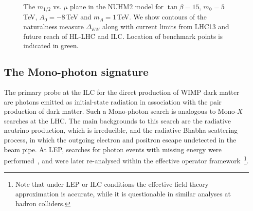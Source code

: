 \begin{figure}[]
  \begin{center}
  \end{center}
  \caption{\label{fig:searches_nuhm2_excl} The $m_{1/2}$ vs. $\mu$ plane in the 
NUHM2 model for $\tan\beta =15$, 
$m_0=5$\,TeV, $A_0=-8$\,TeV and $m_A=1$\,TeV. We show contours of the
naturalness measure $\Delta_{EW}$ \cite{Baer:2015rja}
along with current limits from LHC13 and future reach of HL-LHC and ILC.
Location of benchmark points is indicated in green.} 
\end{figure}


\subsection{The Mono-photon signature}
\label{subsec:searches_monophoton}

The primary probe at the ILC for the direct production of WIMP dark matter are photons
emitted as initial-state radiation in association with the pair production of dark matter.
Such a Mono-photon search is analogous  to Mono-$X$ searches at the LHC.
The main backgrounds to this search are the radiative neutrino production, which is irreducible,
and the radiative Bhabha scattering process, in which the outgoing electron and positron escape 
undetected in the beam pipe.
At LEP, searches for photon events with missing energy were performed~\cite{Abdallah:2003np,*Abdallah:2008aa},
and were later re-analysed within the  effective
operator framework~\cite{Fox:2011fx}\footnote{Note that under LEP or ILC conditions the 
effective field theory approximation is accurate, while it is questionable
in similar analyses at hadron colliders. 
}.

